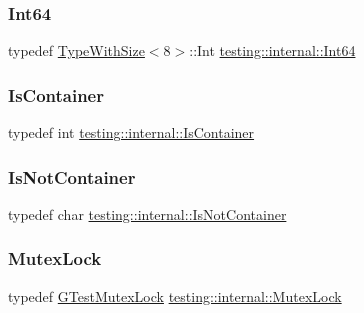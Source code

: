 \subsubsection{\texorpdfstring{Int64}{Int64}}
{\footnotesize\ttfamily typedef \hyperlink{classtesting_1_1internal_1_1_type_with_size}{Type\+With\+Size}$<$8$>$\+::Int \hyperlink{namespacetesting_1_1internal_a271c563fec38b804ddab0677f51f70a8}{testing\+::internal\+::\+Int64}}

\mbox{\label{namespacetesting_1_1internal_ad8f0c2883245f1df2a53618a49f0deb3}} 
\subsubsection{\texorpdfstring{Is\+Container}{IsContainer}}
{\footnotesize\ttfamily typedef int \hyperlink{namespacetesting_1_1internal_ad8f0c2883245f1df2a53618a49f0deb3}{testing\+::internal\+::\+Is\+Container}}

\mbox{\label{namespacetesting_1_1internal_abf080521ce135deb510e0a7830fd3d33}} 
\subsubsection{\texorpdfstring{Is\+Not\+Container}{IsNotContainer}}
{\footnotesize\ttfamily typedef char \hyperlink{namespacetesting_1_1internal_abf080521ce135deb510e0a7830fd3d33}{testing\+::internal\+::\+Is\+Not\+Container}}

\mbox{\label{namespacetesting_1_1internal_a08b187c6cc4e28400aadf9a32fccc8de}} 
\subsubsection{\texorpdfstring{Mutex\+Lock}{MutexLock}}
{\footnotesize\ttfamily typedef \hyperlink{classtesting_1_1internal_1_1_g_test_mutex_lock}{G\+Test\+Mutex\+Lock} \hyperlink{namespacetesting_1_1internal_a08b187c6cc4e28400aadf9a32fccc8de}{testing\+::internal\+::\+Mutex\+Lock}}


